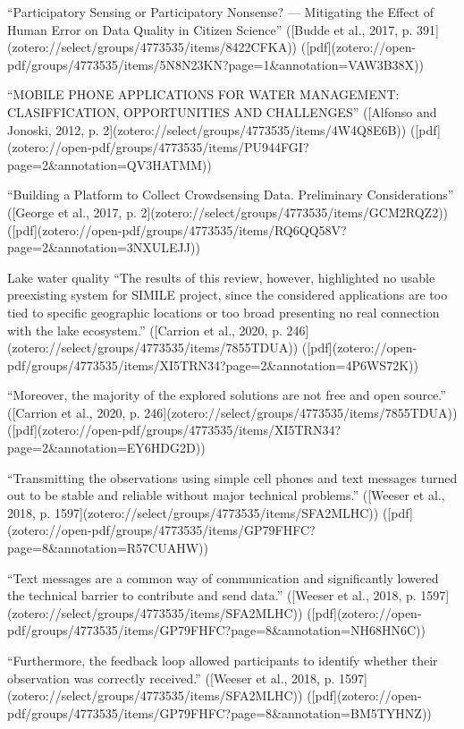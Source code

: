 “Participatory Sensing or Participatory Nonsense? — Mitigating the Effect of Human Error on Data Quality in Citizen Science” ([Budde et al., 2017, p. 391](zotero://select/groups/4773535/items/8422CFKA)) ([pdf](zotero://open-pdf/groups/4773535/items/5N8N23KN?page=1&annotation=VAW3B38X))

“MOBILE PHONE APPLICATIONS FOR WATER MANAGEMENT: CLASIFFICATION, OPPORTUNITIES AND CHALLENGES” ([Alfonso and Jonoski, 2012, p. 2](zotero://select/groups/4773535/items/4W4Q8E6B)) ([pdf](zotero://open-pdf/groups/4773535/items/PU944FGI?page=2&annotation=QV3HATMM))

“Building a Platform to Collect Crowdsensing Data. Preliminary Considerations” ([George et al., 2017, p. 2](zotero://select/groups/4773535/items/GCM2RQZ2)) ([pdf](zotero://open-pdf/groups/4773535/items/RQ6QQ58V?page=2&annotation=3NXULEJJ))

Lake water quality 
“The results of this review, however, highlighted no usable preexisting system for SIMILE project, since the considered applications are too tied to specific geographic locations or too broad presenting no real connection with the lake ecosystem.” ([Carrion et al., 2020, p. 246](zotero://select/groups/4773535/items/7855TDUA)) ([pdf](zotero://open-pdf/groups/4773535/items/XI5TRN34?page=2&annotation=4P6WS72K))

“Moreover, the majority of the explored solutions are not free and open source.” ([Carrion et al., 2020, p. 246](zotero://select/groups/4773535/items/7855TDUA)) ([pdf](zotero://open-pdf/groups/4773535/items/XI5TRN34?page=2&annotation=EY6HDG2D))

“Transmitting the observations using simple cell phones and text messages turned out to be stable and reliable without major technical problems.” ([Weeser et al., 2018, p. 1597](zotero://select/groups/4773535/items/SFA2MLHC)) ([pdf](zotero://open-pdf/groups/4773535/items/GP79FHFC?page=8&annotation=R57CUAHW))

“Text messages are a common way of communication and significantly lowered the technical barrier to contribute and send data.” ([Weeser et al., 2018, p. 1597](zotero://select/groups/4773535/items/SFA2MLHC)) ([pdf](zotero://open-pdf/groups/4773535/items/GP79FHFC?page=8&annotation=NH68HN6C))

“Furthermore, the feedback loop allowed participants to identify whether their observation was correctly received.” ([Weeser et al., 2018, p. 1597](zotero://select/groups/4773535/items/SFA2MLHC)) ([pdf](zotero://open-pdf/groups/4773535/items/GP79FHFC?page=8&annotation=BM5TYHNZ))

